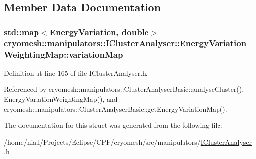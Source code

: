 \subsection{\-Member \-Data \-Documentation}
\hypertarget{structcryomesh_1_1manipulators_1_1IClusterAnalyser_1_1EnergyVariationWeightingMap_af091e1de3319023e57550338117845af}{
\subsubsection[{variation\-Map}]{\setlength{\rightskip}{0pt plus 5cm}std\-::map$<${\bf \-Energy\-Variation}, double$>$ {\bf cryomesh\-::manipulators\-::\-I\-Cluster\-Analyser\-::\-Energy\-Variation\-Weighting\-Map\-::variation\-Map}}}\label{structcryomesh_1_1manipulators_1_1IClusterAnalyser_1_1EnergyVariationWeightingMap_af091e1de3319023e57550338117845af}


\-Definition at line 165 of file \-I\-Cluster\-Analyser.\-h.



\-Referenced by cryomesh\-::manipulators\-::\-Cluster\-Analyser\-Basic\-::analyse\-Cluster(), \-Energy\-Variation\-Weighting\-Map(), and cryomesh\-::manipulators\-::\-Cluster\-Analyser\-Basic\-::get\-Energy\-Variation\-Map().



\-The documentation for this struct was generated from the following file\-:\begin{DoxyCompactItemize}
\item 
/home/niall/\-Projects/\-Eclipse/\-C\-P\-P/cryomesh/src/manipulators/\hyperlink{IClusterAnalyser_8h}{\-I\-Cluster\-Analyser.\-h}\end{DoxyCompactItemize}
